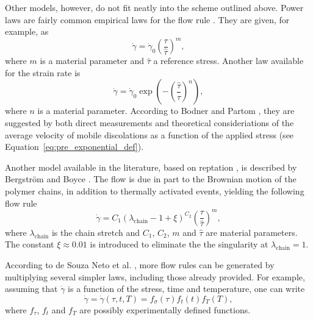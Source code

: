 Other models, however, do not fit neatly into the scheme outlined above.
Power laws are fairly common empirical laws for the flow rule \citep{brownPowerlawCreepEquation1980}.
They are given, for example, as \citep{bergstromMechanicsSolidPolymers2015}
\begin{equation}
	\label{eq:flow_rule_power_law}
	\dot \gamma = \dot \gamma_0 \left(\frac{\tau}{\hat \tau}\right)^m,
\end{equation}
where $m$ is a material parameter and $\hat \tau$ a reference stress.
Another law available for the strain rate is \citep{kellyInfluenceLimitingDislocation1974, bodnerLargeDeformationElasticViscoplastic1972}
\begin{equation}
	\dot \gamma = \dot \gamma_0 \exp\left(-\left(\frac{\hat \tau}{\tau}\right)^n\right),
\end{equation}
where $n$ is a material parameter.
According to Bodner and Partom \citep{bodnerLargeDeformationElasticViscoplastic1972}, they are suggested by both direct measurements and theoretical consideriations of the average velocity of mobile discolations as a function of the applied stress (see Equation~\eqref{eq:pre_exponential_def}).

Another model available in the literature, based on reptation \citep{doiDynamicsConcentratedPolymer1978a}, is described by Bergström and Boyce \citep{bergstromConstitutiveModelingLarge1998, bergstromConstitutiveModelingTimedependent2001}.
The flow is due in part to the Brownian motion of the polymer chains, in addition to thermally activated events, yielding the following flow rule
\begin{equation}
	\label{eq:bb_reptation_model}
	\dot \gamma = C_1(\lambda_\text{chain} -1 + \xi)^{C_2}\left(\frac{\tau}{\hat\tau}\right)^{m},
\end{equation}
where $\lambda_\text{chain}$ is the chain stretch and $C_1$, $C_2$, $m$ and $\hat \tau$ are material parameters.
The constant $\xi\approx 0.01$ is introduced to eliminate the the singularity at $\lambda_\text{chain}=1$.

According to de Souza Neto et al. \citep{desouzanetoComputationalMethodsPlasticity2008}, more flow rules can be generated by multiplying several simpler laws, including those already provided.
For example, assuming that $\dot \gamma$ is a function of the stress, time and temperature, one can write
\begin{equation}
	\dot \gamma = \dot \gamma(\tau, t, T) = f_\sigma (\tau) f_t(t) f_T(T),
\end{equation}
where $f_\tau$, $f_t$ and $f_T$ are possibly experimentally defined functions.

